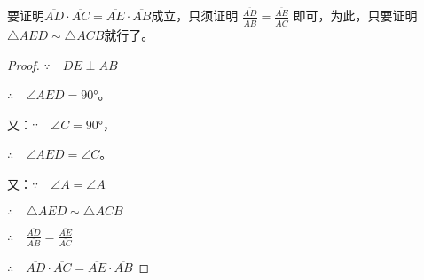 \begin{analyze}
    要证明$\overline{AD}\cdot \overline{AC}=\overline{AE}\cdot \overline{AB}$成立，只须证明
$\frac{\overline{AD}}{\overline{AB}}=\frac{\overline{AE}}{\overline{AC}}$
    即可，为此，只要证明$\triangle AED\sim \triangle ACB$就行了。
\end{analyze}

\begin{proof}
$\because\quad DE\perp AB$

$\therefore\quad \angle AED=\ang{90}$。

又：$\because\quad  \angle C=\ang{90}$，

$\therefore\quad \angle AED=\angle C$。

又：$\because\quad \angle A=\angle A$

$\therefore\quad \triangle AED\sim \triangle ACB$

$\therefore\quad \frac{\overline{AD}}{\overline{AB}}=\frac{\overline{AE}}{\overline{AC}}$

$\therefore\quad \overline{AD}\cdot \overline{AC}=\overline{AE}\cdot \overline{AB}$ 
\end{proof}

\begin{figure}
    \begin{minipage}[t]{0.48\linewidth}
    \centering
\begin{tikzpicture}[>=latex, scale=.8]
    \end{tikzpicture}
    \caption{}
    \end{minipage}
    \begin{minipage}[t]{0.48\linewidth}
    \centering
    \begin{tikzpicture}[>=latex, scale=1]
    \end{tikzpicture}
    \caption{}
    \end{minipage}
    \end{figure}


